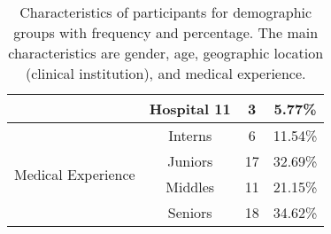 \begin{table}[htpb]
{\begin{tabular}{|c|c|c|c|}
                                      \cline{2-4} 
                                      & Hospital 11     & 3         & 5.77\%     \\ \hline
\multirow{4}{*}{Medical Experience}   & Interns         & 6         & 11.54\%    \\ \cline{2-4} 
                                      & Juniors         & 17        & 32.69\%    \\ \cline{2-4} 
                                      & Middles         & 11        & 21.15\%    \\ \cline{2-4} 
                                      & Seniors         & 18        & 34.62\%    \\ \hline
\end{tabular}
}
\caption[]{Characteristics of participants for demographic groups with frequency and percentage. The main characteristics are gender, age, geographic location (clinical institution), and medical experience.}
\label{tab:tab015}
\end{table}